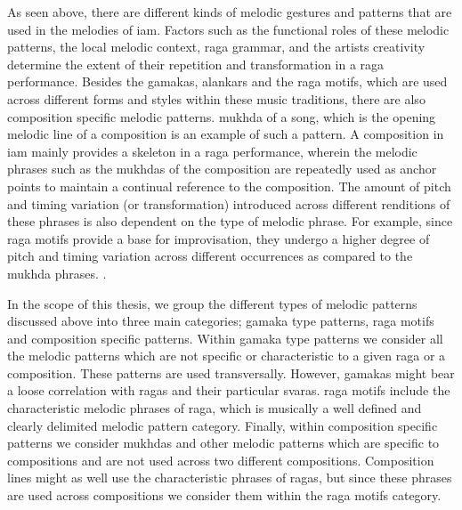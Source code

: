 As seen above, there are different kinds of melodic gestures and patterns that are used in the melodies of \gls{iam}. Factors such as the functional roles of these melodic patterns, the local melodic context, \gls{raga} grammar, and the artists creativity determine the extent of their repetition and transformation in a \gls{raga} performance. Besides the \glspl{gamaka}, \glspl{alankar} and the \gls{raga} motifs, which are used across different forms and styles within these music traditions, there are also composition specific melodic patterns. \gls{mukhda} of a song, which is the opening melodic line of a composition is an example of such a pattern. A composition in \gls{iam} mainly provides a skeleton in a \gls{raga} performance, wherein the melodic phrases such as the \glspl{mukhda} of the composition are repeatedly used as anchor points to maintain a continual reference to the composition. The amount of pitch and timing variation (or transformation) introduced across different renditions of these phrases is also dependent on the type of melodic phrase. For example, since \gls{raga} motifs provide a base for improvisation, they undergo a higher degree of pitch and timing variation across different occurrences as compared to the \gls{mukhda} phrases. .

In the scope of this thesis, we group the different types of melodic patterns discussed above into three main categories; \gls{gamaka} type patterns, \gls{raga} motifs and composition specific patterns. Within \gls{gamaka} type patterns we consider all the melodic patterns which are not specific or characteristic to a given \gls{raga} or a composition. These patterns are used transversally. However, \glspl{gamaka} might bear a loose correlation with  \glspl{raga} and their particular \glspl{svara}. \gls{raga} motifs include the characteristic melodic phrases of \gls{raga}, which is musically a well defined and clearly delimited melodic pattern category. Finally, within composition specific patterns we consider \glspl{mukhda} and other melodic patterns which are specific to compositions and are not used across two different compositions. Composition lines might as well use the characteristic phrases of \glspl{raga}, but since these phrases are used across compositions we consider them within the \gls{raga} motifs category.  


